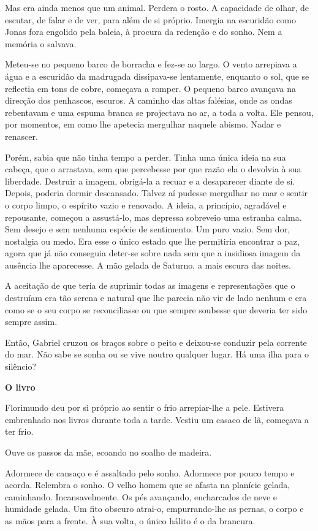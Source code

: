 Mas era ainda menos que um animal. Perdera o rosto. A capacidade de
olhar, de escutar, de falar e de ver, para além de si próprio. Imergia
na escuridão como Jonas fora engolido pela baleia, à procura da redenção
e do sonho. Nem a memória o salvava.

Meteu-se no pequeno barco de borracha e fez-se ao largo. O vento
arrepiava a água e a escuridão da madrugada dissipava-se lentamente,
enquanto o sol, que se reflectia em tons de cobre, começava a romper. O
pequeno barco avançava na direcção dos penhascos, escuros. A caminho das
altas falésias, onde as ondas rebentavam e uma espuma branca se
projectava no ar, a toda a volta. Ele pensou, por momentos, em como lhe
apetecia mergulhar naquele abismo. Nadar e renascer.

Porém, sabia que não tinha tempo a perder. Tinha uma única ideia na sua
cabeça, que o arrastava, sem que percebesse por que razão ela o devolvia
à sua liberdade. Destruir a imagem, obrigá-la a recuar e a desaparecer
diante de si. Depois, poderia dormir descansado. Talvez aí pudesse
mergulhar no mar e sentir o corpo limpo, o espírito vazio e renovado. A
ideia, a princípio, agradável e repousante, começou a assustá-lo, mas
depressa sobreveio uma estranha calma. Sem desejo e sem nenhuma espécie
de sentimento. Um puro vazio. Sem dor, nostalgia ou medo. Era esse o
único estado que lhe permitiria encontrar a paz, agora que já não
conseguia deter-se sobre nada sem que a insidiosa imagem da ausência lhe
aparecesse. A mão gelada de Saturno, a mais escura das noites.

A aceitação de que teria de suprimir todas as imagens e representações
que o destruíam era tão serena e natural que lhe parecia não vir de lado
nenhum e era como se o seu corpo se reconciliasse ou que sempre soubesse
que deveria ter sido sempre assim.

Então, Gabriel cruzou os braços sobre o peito e deixou-se conduzir pela
corrente do mar. Não sabe se sonha ou se vive noutro qualquer lugar. Há
uma ilha para o silêncio?

\vspace*{1.8cm}
\noindent{}\textbf{O livro}

Florimundo deu por si próprio ao sentir o frio arrepiar-lhe a pele.
Estivera embrenhado nos livros durante toda a tarde. Vestiu um casaco de
lã, começava a ter frio.

Ouve os passos da mãe, ecoando no soalho de madeira.

Adormece de cansaço e é assaltado pelo sonho. Adormece por pouco tempo e
acorda. Relembra o sonho. O velho homem que se afasta na planície
gelada, caminhando. Incansavelmente. Os pés avançando, encharcados de
neve e humidade gelada. Um fito obscuro atrai-o, empurrando-lhe as
pernas, o corpo e as mãos para a frente. À sua volta, o único hálito é o
da brancura.

